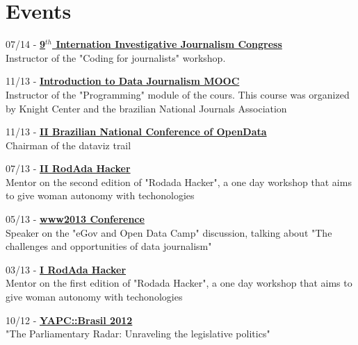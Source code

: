 \documentclass[]{friggeri-cv}
\begin{document}
\section{Events}
07/14 - \href{http://abraji.org.br/congresso/}{\textbf{9$^{th}$ Internation Investigative Journalism Congress}}\\
Instructor of the "Coding for journalists" workshop.

11/13 - \href{https://knightcenter.utexas.edu/pt-br/blog/00-14390-inscricoes-abertas-para-primeiro-curso-da-anj-com-o-centro-knight-introducao-ao-jornal}{\textbf{Introduction to Data Journalism MOOC}}\\
Instructor of the "Programming" module of the cours. This course was organized by Knight Center and the brazilian National Journals Association

11/13 - \href{http://2.encontro.dados.gov.br/encontro.html}{\textbf{II Brazilian National Conference of OpenData}}\\
Chairman of the dataviz trail

07/13 - \href{http://rodadahacker.com/}{\textbf{II RodAda Hacker}}\\
Mentor on the second edition of "Rodada Hacker", a one day workshop that aims to give woman autonomy with techonologies

05/13 - \href{http://www2013.org/}{\textbf{www2013 Conference}}\\
Speaker on the "eGov and Open Data Camp" discussion, talking about "The challenges and opportunities of data journalism"

03/13 - \href{http://rodadahacker.com/}{\textbf{I RodAda Hacker}}\\
Mentor on the first edition of "Rodada Hacker", a one day workshop that aims to give woman autonomy with techonologies

10/12 - \href{http://yapcbrasil.org.br/2012/talk/110}{\textbf{YAPC::Brasil 2012}}\\
"The Parliamentary Radar: Unraveling the legislative politics"
\end{document}
